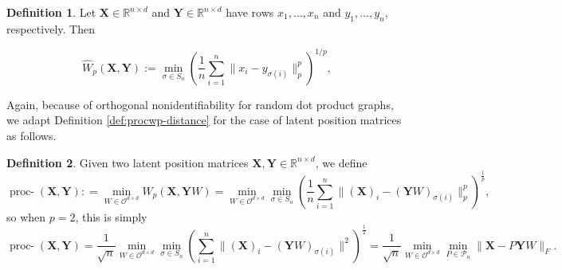 \documentclass[12pt]{article}
\newcommand{\RR}{\mathbb{R}}
\theoremstyle{definition}
\newtheorem{definition}{Definition}
\newcommand{\bX}{\mathbf{X}}
\newcommand{\bY}{\mathbf{Y}}
\newcommand{\procwp}[1][2]{\mathop{\mbox{proc-$W_#1$}}}
\newcommand{\procwphat}[1][2]{\mathop{\mbox{proc-$\hat{W}_#1$}}}
\begin{document}
\begin{definition}\label{def:Wasserstein_empirical}
Let $\bX\in \RR^{n\times d}$ and $\bY\in\RR^{n\times d}$ have rows $x_1,\ldots,x_n$ and $y_1,\ldots,y_n$, respectively. Then 

\begin{equation}
    \label{eq:wassp}
    \hat{W}_p(\bX,\bY):=\min_{\sigma\in S_n} \left(\frac{1}{n}\sum_{i=1}^n \|x_i-y_{\sigma(i)}\|_p^p\right)^{1/p},
\end{equation}
\end{definition}



Again, because of orthogonal nonidentifiability for random dot product graphs, we adapt Definition \ref{def:procwp-distance} for the case of latent position matrices as follows.
\begin{definition}\label{def:procwp_matrix_distance}
Given two latent position matrices $\bX,\bY \in \RR^{n \times d}$, we define 
$$
\procwphat[p] (\bX,\bY) : = \min_{W \in \mathcal{O}^{d\times d} } W_p(\bX,\bY W) = \min_{W \in \mathcal{O}^{d\times d}}\min_{\sigma \in S_n} \left( \frac{1}{n} \sum^n_{i=1}\| (\bX)_i -  (\bY W)_{\sigma(i)} \|_p^p \right)^{\frac{1}{p}},
$$
so when $p = 2$, this is simply
$$
\procwphat (\bX,\bY) =  \frac{1}{\sqrt{n}} \min_{W \in \mathcal{O}^{d\times d}}\min_{\sigma \in S_n} \left(\sum^n_{i=1}\| (\bX)_i -  (\bY W)_{\sigma(i)} \|^2\right)^{\frac{1}{2}} = \frac{1}{\sqrt{n}} \min_{W \in \mathcal{O}^{d\times d}}\min_{P \in \mathcal{P}_n} \|\bX-P\bY W\|_F  .
$$
\end{definition}



 
\end{document}
